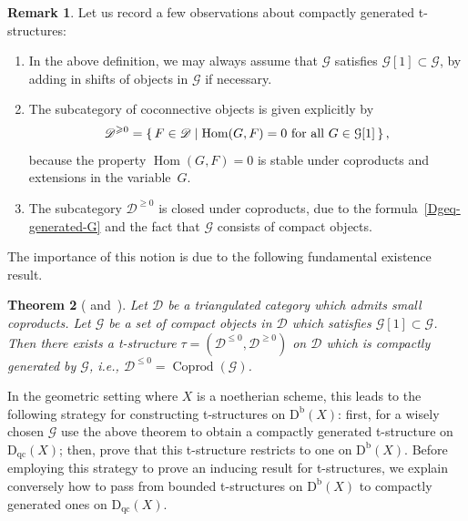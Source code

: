 \documentclass[11pt, reqno]{amsart}
\numberwithin{equation}{section}
\theoremstyle{plain}
\newtheorem{theorem}{Theorem}[section]
\theoremstyle{remark}
\theoremstyle{definition}
\newtheorem{remark}[theorem]{Remark}
\theoremstyle{italicsname}
\newcommand{\st}{\mid}
\newcommand{\set}[1]{\left\{ \, #1 \, \right\}}
\newcommand{\Db}{\mathrm{D^b}}
\newcommand{\Dqc}{\mathrm{D}_{\mathrm{qc}}}
\DeclareMathOperator{\Coprod}{Coprod}
\DeclareMathOperator{\Hom}{Hom}
\newcommand{\cG}{\mathcal{G}}
\newcommand{\cD}{\mathscr{D}}
\begin{document}
\begin{remark}
\label{remark-CG-t-structures}
    Let us record a few observations about compactly generated t-structures: 
    \begin{enumerate}
    \item In the above definition, 
    we may always assume that $\cG$ satisfies $\cG[1] \subset \cG$, by adding in shifts of objects in $\cG$ if necessary. 
    \item The subcategory of coconnective objects is given explicitly by 
    \begin{equation}
    \label{Dgeq-generated-G}
            \cD^{\geqslant 0} = \set{ F \in \cD \st \Hom(G, F) = 0 \textup{ for all } G \in \cG[1]}, 
    \end{equation}
    because the property $\Hom(G, F) = 0$ is stable under coproducts and extensions in the variable~$G$. 
    \item \label{Dgeq-coproduct-closed} The subcategory $\cD^{\geqslant 0}$ is closed under coproducts, due to the formula~\eqref{Dgeq-generated-G} and the fact that $\cG$ consists of compact objects. 
    \end{enumerate}
\end{remark}

The importance of this notion is due to the following fundamental existence result. 

\begin{theorem}[{\cite[Theorem A.1]{AJT:tstructures} and~\cite[Theorem 2.3.3]{CNS:Passage}}]
\label{theorem-generating-t-structures}
Let $\cD$ be a triangulated category which admits small coproducts. 
Let $\cG$ be a set of compact objects in $\cD$ which satisfies $\cG[1] \subset \cG$. 
Then there exists a t-structure $\tau = (\cD^{\leqslant 0}, \cD^{\geqslant 0})$ on $\cD$ which is compactly generated by $\cG$, i.e., $\cD^{\leqslant 0} = \Coprod(\cG)$.
\end{theorem}

In the geometric setting where $X$ is a noetherian scheme, this leads to the following strategy for constructing t-structures on $\Db(X)$: first, for a wisely chosen $\cG$ use the above theorem to obtain a compactly generated t-structure on $\Dqc(X)$; then, prove that this t-structure restricts to one on $\Db(X)$. 
Before employing this strategy to prove an inducing result for t-structures, we explain conversely how to pass from bounded t-structures on $\Db(X)$ to compactly generated ones on $\Dqc(X)$. 
\end{document}
